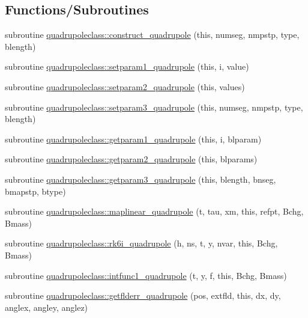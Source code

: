 \subsection*{Functions/\+Subroutines}
\begin{DoxyCompactItemize}
\item 
subroutine \mbox{\hyperlink{namespacequadrupoleclass_afebabbf596b8330dcdbc2741bb939b5c}{quadrupoleclass\+::construct\+\_\+quadrupole}} (this, numseg, nmpstp, type, blength)
\item 
subroutine \mbox{\hyperlink{namespacequadrupoleclass_a34d611929c447e03e1c12c2f72888ca5}{quadrupoleclass\+::setparam1\+\_\+quadrupole}} (this, i, value)
\item 
subroutine \mbox{\hyperlink{namespacequadrupoleclass_a400dc2305f0aca6ab6d6b5475a91363a}{quadrupoleclass\+::setparam2\+\_\+quadrupole}} (this, values)
\item 
subroutine \mbox{\hyperlink{namespacequadrupoleclass_a6e3465265973203b8452b1b2463a2e4b}{quadrupoleclass\+::setparam3\+\_\+quadrupole}} (this, numseg, nmpstp, type, blength)
\item 
subroutine \mbox{\hyperlink{namespacequadrupoleclass_a48e1ded5cfc486c78a47d556fd008e29}{quadrupoleclass\+::getparam1\+\_\+quadrupole}} (this, i, blparam)
\item 
subroutine \mbox{\hyperlink{namespacequadrupoleclass_a8991350fe610b73bca6787f4c528753c}{quadrupoleclass\+::getparam2\+\_\+quadrupole}} (this, blparams)
\item 
subroutine \mbox{\hyperlink{namespacequadrupoleclass_ae5c8a42ae81e07dcb9eb91681d28f04e}{quadrupoleclass\+::getparam3\+\_\+quadrupole}} (this, blength, bnseg, bmapstp, btype)
\item 
subroutine \mbox{\hyperlink{namespacequadrupoleclass_adcdf5386d19cfb0a90cbc42426cf0d44}{quadrupoleclass\+::maplinear\+\_\+quadrupole}} (t, tau, xm, this, refpt, Bchg, Bmass)
\item 
subroutine \mbox{\hyperlink{namespacequadrupoleclass_a156f69f00644d8511e9f1ee150504b83}{quadrupoleclass\+::rk6i\+\_\+quadrupole}} (h, ns, t, y, nvar, this, Bchg, Bmass)
\item 
subroutine \mbox{\hyperlink{namespacequadrupoleclass_a3cbe01df676294387d1293468425aa70}{quadrupoleclass\+::intfunc1\+\_\+quadrupole}} (t, y, f, this, Bchg, Bmass)
\item 
subroutine \mbox{\hyperlink{namespacequadrupoleclass_a41791f03ec33f0255e54ebc7b9519170}{quadrupoleclass\+::getflderr\+\_\+quadrupole}} (pos, extfld, this, dx, dy, anglex, angley, anglez)

\end{DoxyCompactItemize}
